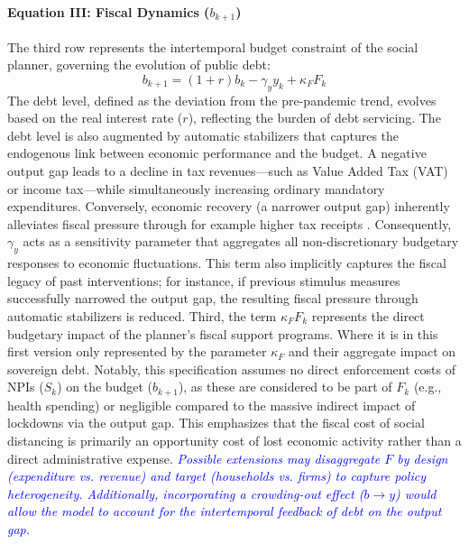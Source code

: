  
 
\paragraph{Equation III: Fiscal Dynamics ($b_{k+1}$)} 
The third row represents the intertemporal budget constraint of the social planner, governing the evolution of public debt:
\begin{equation}
    b_{k+1} = (1+r) b_k - \gamma_y y_k + \kappa_F F_k
\end{equation}
The debt level, defined as the deviation from the pre-pandemic trend, evolves based on the real interest rate ($r$), reflecting the burden of debt servicing. The debt level is also augmented by automatic stabilizers that captures the endogenous link between economic performance and the budget. A negative output gap leads to a decline in tax revenues—such as Value Added Tax (VAT) or income tax—while simultaneously increasing ordinary mandatory expenditures. Conversely, economic recovery (a narrower output gap) inherently alleviates fiscal pressure through for example higher tax receipts . Consequently, $\gamma_y$ acts as a sensitivity parameter that aggregates all non-discretionary budgetary responses to economic fluctuations. This term also implicitly captures the fiscal legacy of past interventions; for instance, if previous stimulus measures successfully narrowed the output gap, the resulting fiscal pressure through automatic stabilizers is reduced. Third, the term $\kappa_F F_k$ represents the direct budgetary impact of the planner’s fiscal support programs. Where it is in this first version only represented by the parameter $\kappa_F$ and their aggregate impact on sovereign debt. Notably, this specification assumes no direct enforcement costs of NPIs ($S_k$) on the budget ($b_{k+1}$), as these are considered to be part of $F_k$ (e.g., health spending) or negligible compared to the massive indirect impact of lockdowns via the output gap. This emphasizes that the fiscal cost of social distancing is primarily an opportunity cost of lost economic activity rather than a direct administrative expense. \textit{\textcolor{blue}{Possible extensions may disaggregate $F$ by design (expenditure vs. revenue) and target (households vs. firms) to capture policy heterogeneity. Additionally, incorporating a crowding-out effect ($b \to y$) would allow the model to account for the intertemporal feedback of debt on the output gap.}}


